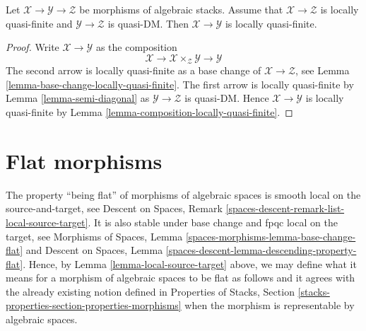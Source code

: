 \begin{lemma}
\label{lemma-quasi-finite-permanence}
Let $\mathcal{X} \to \mathcal{Y} \to \mathcal{Z}$ be morphisms
of algebraic stacks. Assume that $\mathcal{X} \to \mathcal{Z}$
is locally quasi-finite and $\mathcal{Y} \to \mathcal{Z}$ is quasi-DM.
Then $\mathcal{X} \to \mathcal{Y}$ is locally quasi-finite.
\end{lemma}

\begin{proof}
Write $\mathcal{X} \to \mathcal{Y}$ as the composition
$$
\mathcal{X} \longrightarrow
\mathcal{X} \times_\mathcal{Z} \mathcal{Y} \longrightarrow
\mathcal{Y}
$$
The second arrow is locally quasi-finite as a base change of
$\mathcal{X} \to \mathcal{Z}$, see
Lemma \ref{lemma-base-change-locally-quasi-finite}.
The first arrow is locally quasi-finite by
Lemma \ref{lemma-semi-diagonal}
as $\mathcal{Y} \to \mathcal{Z}$ is quasi-DM.
Hence $\mathcal{X} \to \mathcal{Y}$ is locally quasi-finite by
Lemma \ref{lemma-composition-locally-quasi-finite}.
\end{proof}





















\section{Flat morphisms}
\label{section-flat}

\noindent
The property ``being flat'' of morphisms of algebraic
spaces is smooth local on the source-and-target, see
Descent on Spaces, Remark \ref{spaces-descent-remark-list-local-source-target}.
It is also stable under base change and fpqc local on the target, see
Morphisms of Spaces,
Lemma \ref{spaces-morphisms-lemma-base-change-flat}
and
Descent on Spaces, Lemma
\ref{spaces-descent-lemma-descending-property-flat}.
Hence, by
Lemma \ref{lemma-local-source-target}
above, we may define what it means for a morphism of algebraic spaces
to be flat as follows and it agrees with the already
existing notion defined in
Properties of Stacks,
Section \ref{stacks-properties-section-properties-morphisms}
when the morphism is representable by algebraic spaces.

